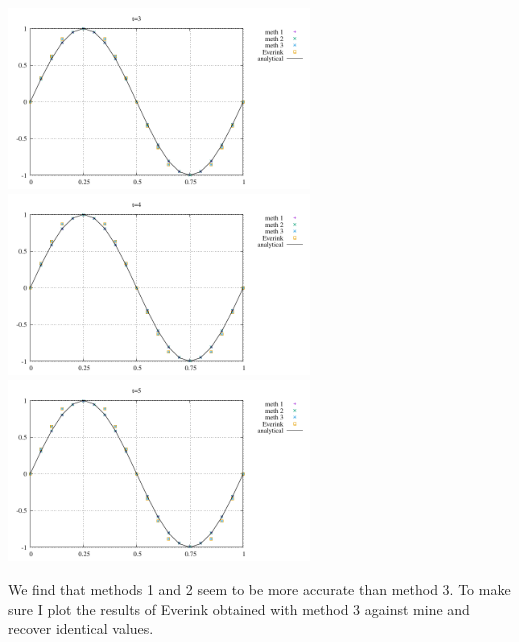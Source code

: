 \begin{center}
\includegraphics[width=8cm]{python_codes/fieldstone_164/results/u_5.pdf}\\
\includegraphics[width=8cm]{python_codes/fieldstone_164/results/u_6.pdf}
\includegraphics[width=8cm]{python_codes/fieldstone_164/results/u_7.pdf}
\end{center}
We find that methods 1 and 2 seem to be more accurate than method 3.
To make sure I plot the results of Everink obtained with method 3 against mine 
and recover identical values.


